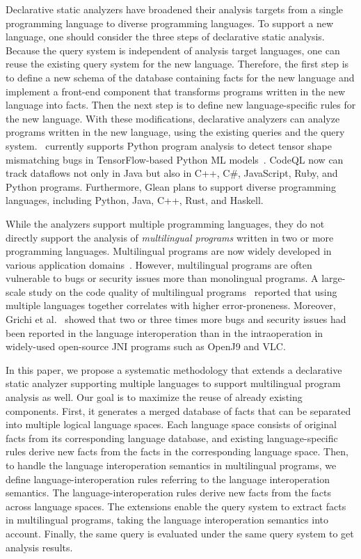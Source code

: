 Declarative static analyzers have broadened their analysis targets from a
single programming language to diverse programming languages. 
To support a new language, one should consider
the three steps of declarative static analysis. Because the query
system is independent of analysis target languages, one can reuse the
existing query system for the new language. Therefore, the first step
is to define a new schema of the database containing facts for the new
language and implement a
front-end component that transforms programs written in the new language into facts.
Then the next step is to define new language-specific rules for the new language.  With these
modifications, declarative analyzers can analyze programs written in the new
language, using the existing queries and the query system.  \doop~currently
supports Python program analysis to detect tensor shape mismatching bugs in
TensorFlow-based Python ML models~\cite{lagouvardos2020static}. 
CodeQL now can track dataflows not only in Java but also in C++, C\#,
JavaScript, Ruby, and Python programs.  Furthermore, Glean plans to support
diverse programming languages, including Python, Java, C++, Rust, and Haskell.

While the analyzers support multiple programming languages, they do not
directly support the analysis of \textit{multilingual programs} written in two
or more programming languages. 
Multilingual programs are now widely developed in various application
domains~\cite{kochhar2016large, mergendahlcross}. However, multilingual
programs are often vulnerable to bugs or security issues more than monolingual
programs. A large-scale study on the code quality of multilingual
programs~\cite{kochhar2016large} reported that using multiple languages
together correlates with higher error-proneness. Moreover, Grichi et
al.~\cite{grichi2020impact} showed that two or three times more bugs and
security issues had been reported in the language interoperation than in the
intraoperation in widely-used open-source JNI programs such as OpenJ9 and VLC.

In this paper, we propose a systematic methodology that extends a
declarative static analyzer supporting multiple languages to support
multilingual program analysis as well. Our goal is to maximize the reuse of
already existing components. First, it generates a merged database of facts that can
be separated into multiple logical language spaces.  Each language space
consists of original facts from its corresponding language database, and existing
language-specific rules derive new facts from the facts in the corresponding
language space. Then, to handle the language interoperation semantics in
multilingual programs, we define language-interoperation rules referring to
the language interoperation semantics. The language-interoperation rules derive new
facts from the facts across language spaces. The extensions enable the query system
to extract facts in multilingual programs, taking the language
interoperation semantics into account.
Finally, the same query is evaluated under the same query system to get
analysis results.

